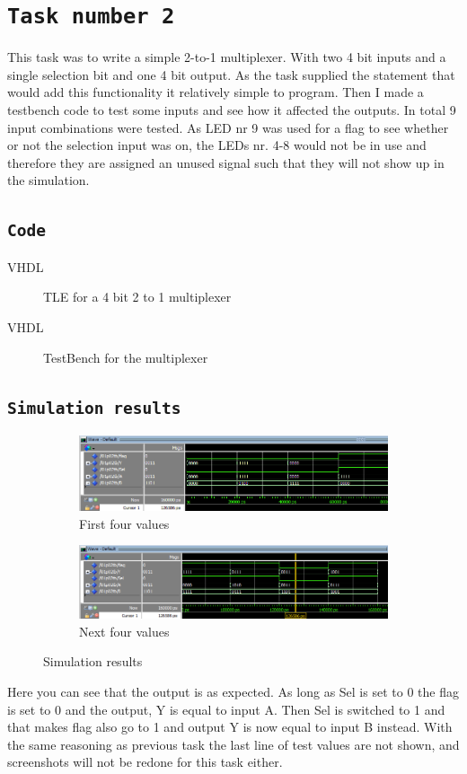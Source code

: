 \documentclass{article}
\let\oldsection\section
\renewcommand{\section}[1]{%
  \oldsection{\texttt{#1}} %
  \setcounter{subsection}{-1} %
  \setcounter{figure}{-1} %
}
\let\oldsubsection\subsection
\renewcommand{\subsection}[1]{%
  \oldsubsection{\texttt{#1}}%
  \setcounter{subsubsection}{-1}%
}
\newcommand{\writecode}[3][Example Code]{%
    \begin{codeBlock}{#1}%
    \end{codeBlock}%
    \begin{figure}[h] %
        \centering
        \renewcommand\figurename{Code}
        \caption{#3} %
        \label{Code:#2} %
    \end{figure}
}
\begin{document}
\section{Task number 2}
This task was to write a simple 2-to-1 multiplexer. With two 4 bit inputs and a single selection bit and one 4 bit output. As the task supplied the statement that would add this functionality it relatively simple to program. Then I made a testbench code to test some inputs and see how it affected the outputs. In total 9 input combinations were tested. As LED nr 9 was used for a flag to see whether or not the selection input was on, the LEDs nr. 4-8 would not be in use and therefore they are assigned an unused signal such that they will not show up in the simulation.

\subsection{Code}
\writecode[VHDL]{Part2_Code.vhd}{TLE for a 4 bit 2 to 1 multiplexer}
\clearpage
\writecode[VHDL]{Part2_TB.vhd}{TestBench for the multiplexer}
\clearpage

\subsection{Simulation results}
\begin{figure}[h]
    \centering
    \begin{subfigure}{1\textwidth}
        \centering
        \includegraphics[width=1\textwidth]{Figures/Part2_Sim1.png}
        \caption{First four values}
        \label{fig:T02sim1}
    \end{subfigure}
    \begin{subfigure}{1\textwidth}
        \centering
        \includegraphics[width=1\textwidth]{Figures/Part2_Sim2.png}
        \caption{Next four values}
        \label{fig:T02sim2}
    \end{subfigure}
    \caption{Simulation results}
    \label{fig:T02sim}
\end{figure}
Here you can see that the output is as expected. As long as Sel is set to 0 the flag is set to 0 and the output, Y is equal to input A. Then Sel is switched to 1 and that makes flag also go to 1 and output Y is now equal to input B instead. With the same reasoning as previous task the last line of test values are not shown, and screenshots will not be redone for this task either.
\end{document}
